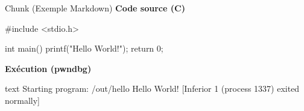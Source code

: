 \documentclass[10pt]{beamer}
\begin{document}
\begin{frame}[fragile]{Chunk (Exemple Markdown)}
    \textbf{Code source (C)}
    \begin{ccode}
#include <stdio.h>

int main() {
    printf("Hello World!\n");
    return 0;
}
    \end{ccode}
    
    \vspace{0.5em}
    \textbf{Exécution (pwndbg)}
    \begin{pwndbg}[run]{text}
Starting program: /out/hello
Hello World!
[Inferior 1 (process 1337) exited normally]
    \end{pwndbg}
\end{frame}
\end{document}
